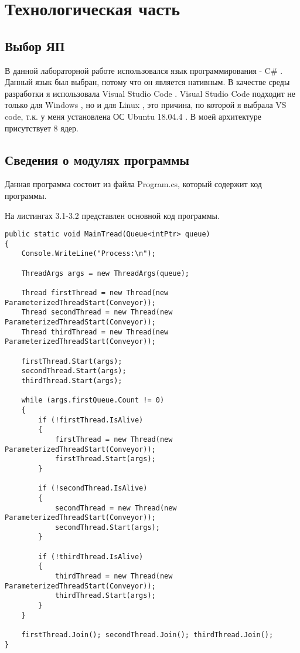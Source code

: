 \chapter{Технологическая часть}

\section{Выбор ЯП}

В данной лабораторной работе использовался язык программирования - C\# \cite{Microsoft}.
Данный язык был выбран, потому что он является нативным.
В качестве среды разработки я использовала Visual Studio Code \cite{Vs}.
Visual Studio Code подходит не только для  Windows \cite{Win},
но и для Linux \cite{Lin}, это причина,
по которой я выбрала VS code,
т.к. у меня установлена ОС Ubuntu 18.04.4 \cite{Ubuntu}.
В моей архитектуре присутствует 8 ядер.


\section{Сведения о модулях программы}

Данная программа состоит из файла Program.cs, который содержит код программы.

На листингах 3.1-3.2 представлен основной код программы.

\begin{lstlisting}[label=some-code,caption=Метод создания и запуска потоков]
public static void MainTread(Queue<intPtr> queue)
{
	Console.WriteLine("Process:\n");
	
	ThreadArgs args = new ThreadArgs(queue);
	
	Thread firstThread = new Thread(new ParameterizedThreadStart(Conveyor));
	Thread secondThread = new Thread(new ParameterizedThreadStart(Conveyor));
	Thread thirdThread = new Thread(new ParameterizedThreadStart(Conveyor));
	
	firstThread.Start(args);
	secondThread.Start(args);
	thirdThread.Start(args);

	while (args.firstQueue.Count != 0)
	{
		if (!firstThread.IsAlive)
		{
			firstThread = new Thread(new ParameterizedThreadStart(Conveyor));
			firstThread.Start(args);
		}
	
		if (!secondThread.IsAlive)
		{
			secondThread = new Thread(new ParameterizedThreadStart(Conveyor));
			secondThread.Start(args);
		}
	
		if (!thirdThread.IsAlive)
		{
			thirdThread = new Thread(new ParameterizedThreadStart(Conveyor));
			thirdThread.Start(args);
		}
	}
	
	firstThread.Join(); secondThread.Join(); thirdThread.Join();
}
\end{lstlisting}

